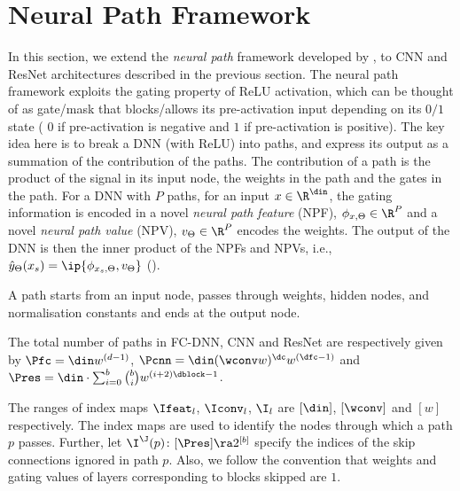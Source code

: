 \section{Neural Path Framework}\label{sec:npf}
In this section, we extend the \emph{neural path} framework developed by , to CNN and ResNet architectures described in the previous section. The neural path framework exploits the gating property of ReLU activation, which can be thought of as gate/mask that blocks/allows its pre-activation input depending on its $0/1$ state ( $0$ if pre-activation is negative and $1$ if pre-activation is positive). The key idea here is to  break a DNN (with ReLU) into paths, and express its output as a summation of the contribution of the paths. The contribution of a path is the product of the signal in its input node, the weights in the path and the gates in the path. For a DNN with $P$ paths, for an input $x\in\R^{\din}$,  the gating information is encoded in a novel \emph{neural path feature} (NPF), $\phi_{x,\Theta}\in\R^P$ and a novel \emph{neural path value} (NPV), $v_{\Theta}\in\R^P$ encodes the weights.  The output of the DNN is then the inner product of the NPFs and NPVs, i.e., $\hat{y}_{\Theta}(x_s)=\ip{\phi_{x_s,\Theta},v_{\Theta}}$ ().
\begin{definition}
A path starts from an input node, passes through weights, hidden nodes, and normalisation constants and ends at the output node.
\end{definition}
\begin{proposition}
The total number of paths in FC-DNN, CNN and ResNet are respectively given by $\Pfc=\din w^{(d-1)}$,  $\Pcnn=\din(\wconv w)^{\dc}w^{(\dfc-1)}$ and $\Pres = \din \cdot\sum_{i=0}^b \binom{b}{i} w^{(i+2)\dblock-1}$.
\end{proposition}
\begin{notation}
The ranges of index maps $\Ifeat_l$,  $\Iconv_l$, $\I_l$ are $[\din]$, $[\wconv]$ and $[w]$ respectively. The index maps are used to identify the nodes through which a path $p$ passes. Further, let $\I^{\J}(p)\colon [\Pres]\ra 2^{[b]}$ specify the indices of the skip connections ignored in path $p$.  Also, we follow the convention that weights and gating values of layers corresponding to blocks skipped are $1$.
\end{notation}

